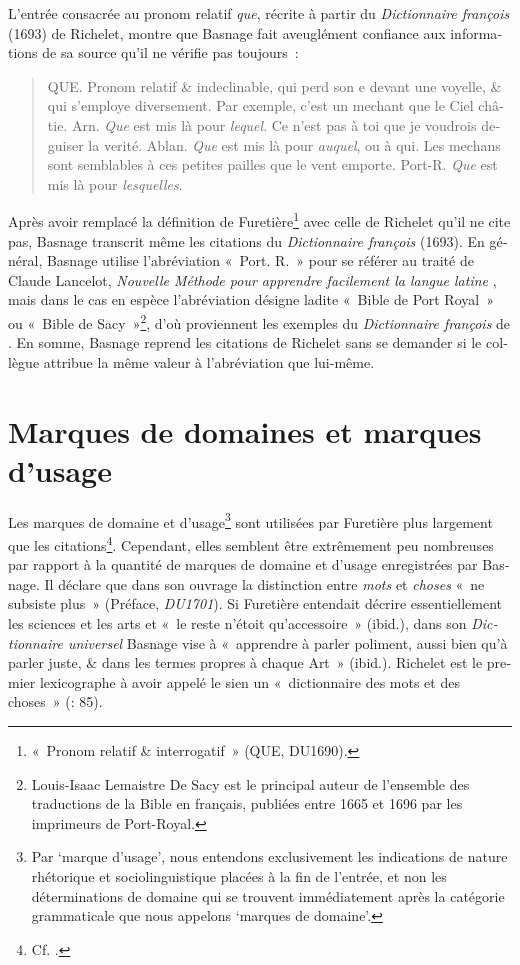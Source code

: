 \documentclass[output=paper,colorlinks,citecolor=brown,arabicfont,chinesefont,booklanguage=french]{langscibook}
\begin{document}
\begin{otherlanguage}{french}
L’entrée consacrée au pronom relatif \emph{que}, récrite à partir du \emph{Dictionnaire françois} (1693) de Richelet, montre que Basnage fait aveuglément confiance aux informations de sa source qu’il ne vérifie pas toujours~:

\begin{quote}
    QUE. Pronom relatif \& indeclinable, qui perd son e devant une voyelle, \& qui s’employe diversement. Par exemple, c’est un mechant que le Ciel châtie. Arn. \emph{Que} est mis là pour \emph{lequel}. Ce n’est pas à toi que je voudrois deguiser la verité. Ablan. \emph{Que} est mis là pour \emph{auquel}, ou à qui. Les mechans sont semblables à ces petites pailles que le vent emporte. Port-R. \emph{Que} est mis là pour \emph{lesquelles}. 
\end{quote}

Après avoir remplacé la définition de Furetière\footnote{«~Pronom relatif \& interrogatif~» (QUE, DU1690).} avec celle de Richelet qu’il ne cite pas, Basnage transcrit même les citations du \emph{Dictionnaire françois} (1693). En général, Basnage utilise l’abréviation «~Port. R.~» pour se référer au traité de Claude Lancelot, \emph{Nouvelle Méthode pour apprendre facilement la langue latine} \citep{Lancelot1662}, mais dans le cas en espèce l’abréviation désigne ladite «~Bible de Port Royal~» ou «~Bible de Sacy~»\footnote{Louis-Isaac Lemaistre De Sacy est le principal auteur de l’ensemble des traductions de la Bible en français, publiées entre 1665 et 1696 par les imprimeurs de Port-Royal.}, d’où proviennent les exemples du \emph{Dictionnaire françois} de \citet{Richelet1693}. En somme, Basnage reprend les citations de Richelet sans se demander si le collègue attribue la même valeur à l'abréviation que lui-même.

\section{Marques de domaines et marques d’usage}

Les marques de domaine et d'usage\footnote{Par ‘marque d'usage’, nous entendons exclusivement les indications de nature rhétorique et sociolinguistique placées à la fin de l'entrée, et non les déterminations de domaine qui se trouvent immédiatement après la catégorie grammaticale que nous appelons ‘marques de domaine’.} sont utilisées par Furetière plus largement que les citations\footnote{Cf. \citet{Rey1990}.}. Cependant, elles semblent être extrêmement peu nombreuses par rapport à la quantité de marques de domaine et d'usage enregistrées par Basnage. Il déclare que dans son ouvrage la distinction entre \emph{mots} et \emph{choses} «~ne subsiste plus~» (Préface, \textit{DU1701}). Si Furetière entendait décrire essentiellement les sciences et les arts et «~le reste n’étoit qu’accessoire~» (ibid.), dans son \emph{Dictionnaire universel} Basnage vise à «~apprendre à parler poliment, aussi bien qu’à parler juste, \& dans les termes propres à chaque Art~» (ibid.). Richelet est le premier lexicographe à avoir appelé le sien un «~dictionnaire des mots et des choses~» (\citealt{Quemada1967}:  85).


\end{otherlanguage}
\end{document}
